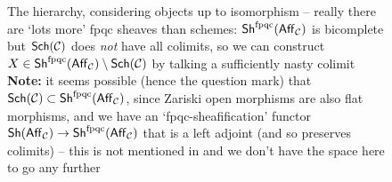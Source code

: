         \begin{figure}[h!]
            \centering
            \begin{minipage}[t]{0.65\textwidth}
                \vspace{0pt}
            \end{minipage}
            \hfill
            \begin{minipage}[t]{0.33\textwidth}
                \vspace{0pt}
                \caption{The hierarchy, considering objects up to isomorphism -- really there are `lots more' fpqc sheaves than schemes: $\mathsf{Sh}^{\text{fpqc}}(\mathsf{Aff}_{\mathcal{C}})$ is bicomplete but $\mathsf{Sch}(\mathcal{C})$ does \emph{not} have all colimits, so we can construct $X\in\mathsf{Sh}^{\text{fpqc}}(\mathsf{Aff}_{\mathcal{C}})\setminus\mathsf{Sch}(\mathcal{C})$ by talking a sufficiently nasty colimit\\\textbf{Note:} it seems possible (hence the question mark) that $\mathsf{Sch}(\mathcal{C})\subset\mathsf{Sh}^\text{fpqc}(\mathsf{Aff}_{\mathcal{C}})$, since Zariski open morphisms are also flat morphisms, and we have an `fpqc-sheafification' functor $\mathsf{Sh}(\mathsf{Aff}_{\mathcal{C}})\to\mathsf{Sh}^\text{fpqc}(\mathsf{Aff}_{\mathcal{C}})$ that is a left adjoint (and so preserves colimits) -- this is not mentioned in \cite{Toen:2005wxa} and we don't have the space here to go any further}\label{fg:hierarchy}
            \end{minipage}
        \end{figure}

